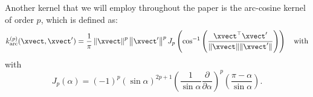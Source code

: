 Another kernel that we will employ throughout the paper is the arc-cosine kernel of order $p$, which is defined as:
\begin{equation} \label{eq:kernel:arccosine:ard}
k_{\text{arc}}^{(p)}(\xvect, \xvect^{\prime}) = 
\frac{1}{\pi} \left\| \xvect \right\|^p \left\|\xvect^{\prime}\right\|^p J_p\left( \cos^{-1}\left( \frac{\xvect^{\top} \xvect^{\prime}}{\| \xvect \| \| \xvect^{\prime}\|} \right) \right) 
\quad \text{with}
\end{equation}
with
\begin{equation}
J_p(\alpha) = (-1)^p (\sin \alpha)^{2p + 1} \left(\frac{1}{\sin\alpha} \frac{\partial}{\partial \alpha}\right)^p \left( \frac{\pi - \alpha}{\sin \alpha} \right) \text{.}
\end{equation}



